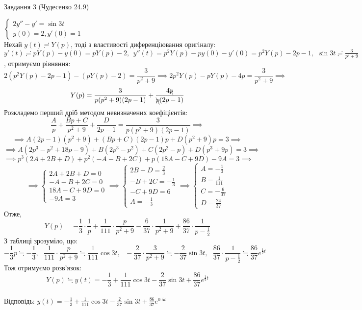 \documentclass[12 pt]{article}
\begin{document}
 \begin{center}
    \large 
    Завдання 3 (Чудесенко 24.9)
\end{center}
$\begin{cases}
    2y''-y'= \sin{3t} \\ 
    y(0) = 2, y'(0) = 1
\end{cases}$ \\ 
Нехай $y(t) \risingdotseq Y(p)$, тоді з властивості диференціювання оригіналу: \\
$y'(t) \risingdotseq pY(p) - y(0) = pY(p) - 2, \ \ 
y''(t) = p^2Y(p) - py(0) - y'(0) = p^2Y(p) - 2p - 1, \ \ 
\sin3t \risingdotseq \frac{3}{p^2 + 9}$, отримуємо рівняння: \\ 
$$
2(p^2Y(p)-2p-1) - (pY(p) - 2) = \frac{3}{p^2 + 9}
\implies 
2p^2Y(p) - p Y(p) -4p = \frac{3}{p^2 + 9}
\implies$$ 
$$ 
Y(p) = \frac{3}{p(p^2+9)(2p-1)} + \frac{4\bcancel{p}}{\bcancel{p}(2p-1)}
$$ 
Розкладемо перший дріб методом невизначених коефіцієнтів: \\ 
$$
\frac{A}{p} + \frac{Bp+C}{p^2+9} + \frac{D}{2p-1} = \frac{3}{p(p^2+9)(2p-1)}
\implies $$
$$ \implies
A(2p-1)(p^2+9) + (Bp+C)(2p-1)p + D(p^2+9)p = 3 \implies$$
$$ \implies
A(2p^3-p^2+18p-9) + B(2p^3-p^2) + C(2p^2-p) + D(p^3+9p) = 3 \implies
$$
$$
\implies
p^3(2A + 2B + D) + p^2(-A - B + 2C) + p(18A - C + 9D) -9A = 3 \implies
$$
$$ \implies
\begin{cases}
    2A+2B+D = 0 \\ 
    -A - B + 2C = 0 \\ 
    18A - C + 9 D = 0 \\ 
    -9 A = 3
\end{cases}
\implies
\begin{cases}
    2B+D = \frac{2}{3} \\ 
    - B + 2C = -\frac{1}{3} \\ 
    - C + 9 D = 6 \\ 
    A = -\frac{1}{3}
\end{cases}
\implies
\begin{cases}
    A = -\frac{1}{3} \\ 
    B = \frac{1}{111} \\ 
    C = -\frac{6}{37} \\ 
    D = \frac{24}{37}
\end{cases}
$$
Отже,
$$
Y(p) = -\frac{1}{3} \cdot  \frac{1}{p}
+ \frac{1}{111} \cdot \frac{p}{p^2+9}
-\frac{6}{37} \cdot \frac{1}{p^2+9}
+ \frac{86}{37} \cdot \frac{1}{p-\frac{1}{2}}
$$
З таблиці зрозуміло, що:
$$
-\frac{1}{3}p \fallingdotseq  -\frac{1}{3}, \ \ \ 
\frac{1}{111} \cdot  \frac{p}{p^2+9} \fallingdotseq \frac{1}{111} \cos{3t}, \ \ \ 
-\frac{2}{37} \cdot \frac{3}{p^2+9} \fallingdotseq -\frac{2}{37} \sin{3t}, \ \ \ 
\frac{86}{37} \cdot \frac{1}{p-\frac{1}{2}} \fallingdotseq \frac{86}{37} e^{\frac{1}{2}t}
$$
Тож отримуємо розв'язок:\\ 
$$Y(p) \fallingdotseq y(t) = 
-\frac{1}{3} + \frac{1}{111} \cos{3t} - \frac{2}{37} \sin{3t} +
 \frac{86}{37} e^{\frac{1}{2}t}$$
\\Відповідь: $y(t)= 
-\frac{1}{3} + \frac{1}{111} \cos{3t} - \frac{2}{37} \sin{3t} +
 \frac{86}{37} e^{0.5t}$ 
\end{document}
